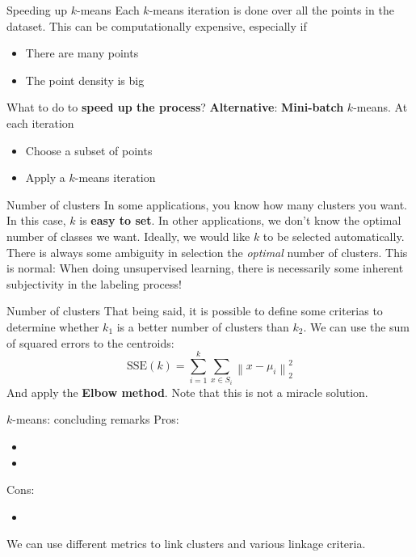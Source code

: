 \documentclass{beamer}
\newcommand{\norm}[1]{\left\lVert#1\right\rVert}
\begin{document}
\begin{frame}{Speeding up $k$-means}
Each $k$-means iteration is done over all the points in the dataset. This can be computationally expensive, especially if
\begin{itemize}
	\item There are many points
	\item The point density is big
\end{itemize}
What to do to \textbf{speed up the process}?
\pause
\vfill
\textbf{Alternative}: \textbf{Mini-batch} $k$-means. At each iteration
\begin{itemize}
	\item Choose a subset of points
	\item Apply a $k$-means iteration 
\end{itemize}
\end{frame}

\begin{frame}{Number of clusters}
In some applications, you know how many clusters you want. In this case, $k$ is \textbf{easy to set}.
\vfill
In other applications, we don't know the optimal number of classes we want. Ideally, we would like $k$ to be selected automatically.
\vfill
There is always some ambiguity in selection the \textit{optimal} number of clusters. This is normal: When doing unsupervised learning, there is necessarily some inherent subjectivity in the labeling process!
\end{frame}

\begin{frame}{Number of clusters}
That being said, it is possible to define some criterias to determine whether $k_1$ is a better number of clusters than $k_2$. We can use the sum of squared errors to the centroids:
\begin{equation*}
\text{SSE}(k) = \sum_{i = 1}^{k} \sum_{x \in S_i} \norm{x - \mu_i}_2^2
\end{equation*}
And apply the \textbf{Elbow method}.
\vfill
\pause
Note that this is not a miracle solution.
\end{frame}

\begin{frame}{$k$-means: concluding remarks}
Pros:
\begin{itemize}
	\item 
	\item 
\end{itemize}
\vfill
\pause
Cons:
\begin{itemize}
	\item 
\end{itemize}
\vfill
\pause
We can use different metrics to link clusters and various linkage criteria.
\end{frame}
\end{document}
